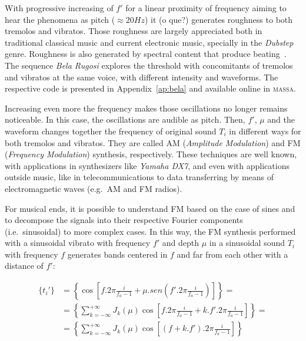 \documentclass[
 aip,
 jmp,
 amsmath,amssymb,
 reprint,
]{revtex4-1}
\newcommand{\massa}{{\large \textsc{massa}}}
\begin{document}
With progressive increasing of $f'$ for a linear proximity of frequency aiming
to hear the phenomena as pitch ($\approx 20Hz$) it (o que?) generates roughness to both
tremolos and vibratos. Those roughness are largely appreciated both in
traditional classical music and current electronic music, specially in the
\emph{Dubstep} genre.  Roughness is also generated by spectral content that
produce beating~\cite{Porres,porres2009}. The sequence \emph{Bela Rugosi}
explores the threshold with concomitants of tremolos and vibratos at the same
voice, with different intensity and waveforms. The respective code is presented in
Appendix~\ref{ap:bela} and available online in \massa.

Increasing even more the frequency makes those oscillations no longer remains
noticeable. In this case, the oscillations are audible as pitch. Then, $f'$,
$\mu$ and the waveform changes together the frequency of original sound $T_i$
in different ways for both tremolos and vibratos.  They are called AM
(\emph{Amplitude Modulation}) and FM (\emph{Frequency Modulation}) synthesis,
respectively.  These techniques are well known, with applications in
synthesizers like \emph{Yamaha DX7}, and even with applications outside music, like
in telecommunications to data transferring by means of electromagnetic waves
(e.g.\ AM and FM radios).

For musical ends, it is possible to understand FM based on the
case of sines and to decompose the signals into their respective Fourier
components (i.e.\ sinusoidal) to more complex cases. In this way, the FM
synthesis performed with a sinusoidal vibrato with frequency $f'$ and depth
$\mu$ in a sinusoidal sound $T_i$ with frequency $f$ generates bands
centered in $f$ and far from each other with a distance of $f'$:

\begin{equation}\label{eq:fmEsp}
\begin{split}
\{t_i'\} & = \left \{ \cos \left [f . 2 \pi \frac{i}{f_a-1} + \mu . sen \left ( f' . 2 \pi \frac{i}{ f_a -1 } \right ) \right ] \right \} = \\
 & = \left \{ \sum_{k=-\infty}^{+\infty} J_k(\mu) \cos \left [ f . 2 \pi \frac{i}{f_a-1} + k . f' . 2 \pi \frac{i}{f_a-1} \right ]  \right \} = \\
 & = \left \{ \sum_{k=-\infty}^{+\infty} J_k(\mu) \cos \left [ (f+k.f') . 2 \pi \frac{i}{f_a-1} \right ]  \right \}
\end{split}
\end{equation}
\end{document}
